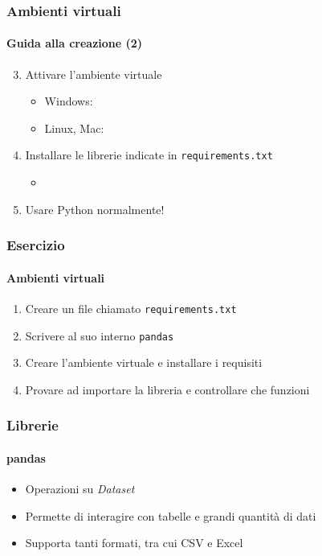 \begin{exampleframe}
    \frametitle{Ambienti virtuali}
    \framesubtitle{Guida alla creazione (2)}

    \begin{enumerate}
        \setcounter{enumi}{2}
        \item Attivare l'ambiente virtuale
        \begin{itemize}
            \item Windows: 
            \item Linux, Mac: 
        \end{itemize}

        \bigskip
        \item Installare le librerie indicate in \texttt{requirements.txt}
        \begin{itemize}
            \item {}
        \end{itemize}

        \bigskip
        \item Usare Python normalmente!
    \end{enumerate}
\end{exampleframe}

\begin{exerciseframe}
    \frametitle{Esercizio}
    \framesubtitle{Ambienti virtuali}

    \begin{enumerate}
        \item Creare un file chiamato \texttt{requirements.txt}
        \item Scrivere al suo interno \texttt{pandas}
        \item Creare l'ambiente virtuale e installare i requisiti
        \item Provare ad importare la libreria e controllare che funzioni
    \end{enumerate}    
\end{exerciseframe}

\begin{contentframe}
    \frametitle{Librerie}
    \framesubtitle{pandas}

    \begin{itemize}
        \item Operazioni su \textit{Dataset}

        \item Permette di interagire con tabelle e grandi quantità di dati

        \bigskip
        \item Supporta tanti formati, tra cui CSV e Excel
    \end{itemize}
\end{contentframe}

